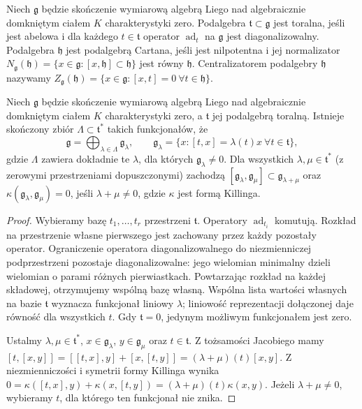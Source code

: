 \begin{definicja}
\label{aa:def:toral-cartan}
Niech $\mathfrak g$ będzie skończenie wymiarową algebrą Liego nad algebraicznie domkniętym ciałem $K$ charakterystyki zero. Podalgebra $\mathfrak t\subset\mathfrak g$ jest toralna, jeśli jest abelowa i dla każdego $t\in\mathfrak t$ operator $\operatorname{ad}_t$ na $\mathfrak g$ jest diagonalizowalny. Podalgebra $\mathfrak h$ jest podalgebrą Cartana, jeśli jest nilpotentna i jej normalizator
$N_{\mathfrak g}(\mathfrak h)=\{x\in\mathfrak g:[x,\mathfrak h]\subset\mathfrak h\}$ jest równy $\mathfrak h$. Centralizatorem podalgebry $\mathfrak h$ nazywamy $Z_{\mathfrak g}(\mathfrak h)=\{x\in\mathfrak g:[x,t]=0\ \forall t\in\mathfrak h\}$.
\end{definicja}

\begin{lemat}
\label{aa:lem:toral-weight}
Niech $\mathfrak g$ będzie skończenie wymiarową algebrą Liego nad algebraicznie domkniętym ciałem $K$ charakterystyki zero, a $\mathfrak t$ jej podalgebrą toralną. Istnieje skończony zbiór $\Lambda\subset\mathfrak t^*$ takich funkcjonałów, że
\[
 \mathfrak g=\bigoplus_{\lambda\in\Lambda}\mathfrak g_\lambda,\qquad
 \mathfrak g_\lambda=\{x:[t,x]=\lambda(t)x\ \forall t\in\mathfrak t\},
\]
gdzie $\Lambda$ zawiera dokładnie te $\lambda$, dla których $\mathfrak g_\lambda\ne0$. Dla wszystkich $\lambda,\mu\in\mathfrak t^*$ (z zerowymi przestrzeniami dopuszczonymi) zachodzą
$[\mathfrak g_\lambda,\mathfrak g_\mu]\subset\mathfrak g_{\lambda+\mu}$ oraz
$\kappa(\mathfrak g_\lambda,\mathfrak g_\mu)=0$, jeśli $\lambda+\mu\ne0$, gdzie $\kappa$ jest formą Killinga.
\end{lemat}
\begin{proof}
Wybieramy bazę $t_1,\ldots,t_r$ przestrzeni $\mathfrak t$. Operatory $\operatorname{ad}_{t_i}$ komutują. Rozkład na przestrzenie własne pierwszego jest zachowany przez każdy pozostały operator. Ograniczenie operatora diagonalizowalnego do niezmienniczej podprzestrzeni pozostaje diagonalizowalne: jego wielomian minimalny dzieli wielomian o parami różnych pierwiastkach. Powtarzając rozkład na każdej składowej, otrzymujemy wspólną bazę własną. Wspólna lista wartości własnych na bazie $\mathfrak t$ wyznacza funkcjonał liniowy $\lambda$; liniowość reprezentacji dołączonej daje równość dla wszystkich $t$. Gdy $\mathfrak t=0$, jedynym możliwym funkcjonałem jest zero.

Ustalmy $\lambda,\mu\in\mathfrak t^*$, $x\in\mathfrak g_\lambda$, $y\in\mathfrak g_\mu$ oraz $t\in\mathfrak t$. Z tożsamości Jacobiego mamy
$[t,[x,y]]=[[t,x],y]+[x,[t,y]]=(\lambda+\mu)(t)[x,y]$.
Z niezmienniczości i symetrii formy Killinga wynika
$0=\kappa([t,x],y)+\kappa(x,[t,y])=(\lambda+\mu)(t)\kappa(x,y)$.
Jeżeli $\lambda+\mu\ne0$, wybieramy $t$, dla którego ten funkcjonał nie znika.
\end{proof}

